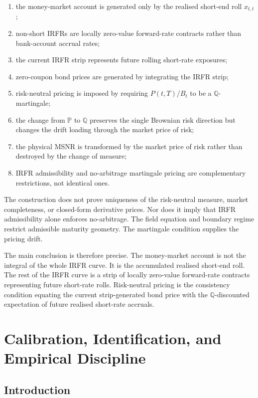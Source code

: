 \documentclass[11pt,oneside]{book}
\begin{document}
\begin{enumerate}
\item the money-market account is generated only by the realised short-end
roll \(x_{t,t}\);
\item non-short IRFRs are locally zero-value forward-rate contracts rather
than bank-account accrual rates;
\item the current IRFR strip represents future rolling short-rate
exposures;
\item zero-coupon bond prices are generated by integrating the IRFR strip;
\item risk-neutral pricing is imposed by requiring \(P(t,T)/B_t\) to be a
\(\mathbb Q\)-martingale;
\item the change from \(\mathbb P\) to \(\mathbb Q\) preserves the single
Brownian risk direction but changes the drift loading through the market
price of risk;
\item the physical MSNR is transformed by the market price of risk rather
than destroyed by the change of measure;
\item IRFR admissibility and no-arbitrage martingale pricing are
complementary restrictions, not identical ones.
\end{enumerate}

The construction does not prove uniqueness of the risk-neutral measure,
market completeness, or closed-form derivative prices. Nor does it imply
that IRFR admissibility alone enforces no-arbitrage. The field equation
and boundary regime restrict admissible maturity geometry. The
martingale condition supplies the pricing drift.

The main conclusion is therefore precise. The money-market account is not
the integral of the whole IRFR curve. It is the accumulated realised
short-end roll. The rest of the IRFR curve is a strip of locally
zero-value forward-rate contracts representing future short-rate rolls.
Risk-neutral pricing is the consistency condition equating the current
strip-generated bond price with the \(\mathbb Q\)-discounted expectation
of future realised short-rate accruals.



\chapter{Calibration, Identification, and Empirical Discipline}\label{chapter-12}

\section{Introduction}\label{introduction-8}
\end{document}
